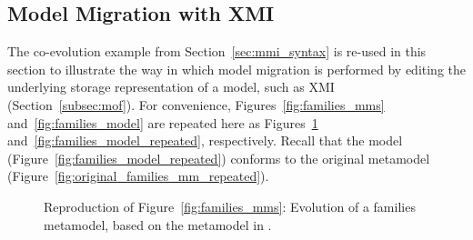 \subsection{Model Migration with XMI}
\label{subsec:migration_with_xmi}
The co-evolution example from Section~\ref{sec:mmi_syntax} is re-used in this section to illustrate the way in which model migration is performed by editing the underlying storage representation of a model, such as XMI (Section~\ref{subsec:mof}). For convenience, Figures~\ref{fig:families_mms} and~\ref{fig:families_model} are repeated here as Figures~\ref{fig:families_mms_repeated} and~\ref{fig:families_model_repeated}, respectively. Recall that the model (Figure~\ref{fig:families_model_repeated}) conforms to the original metamodel (Figure~\ref{fig:original_families_mm_repeated}).

\begin{figure}[htbp]
	\centering
	\caption[Evolution of a families metamodel]{Reproduction of Figure~\ref{fig:families_mms}: Evolution of a families metamodel, based on the metamodel in \cite{hutn}.}
\label{fig:families_mms_repeated}
\end{figure}


